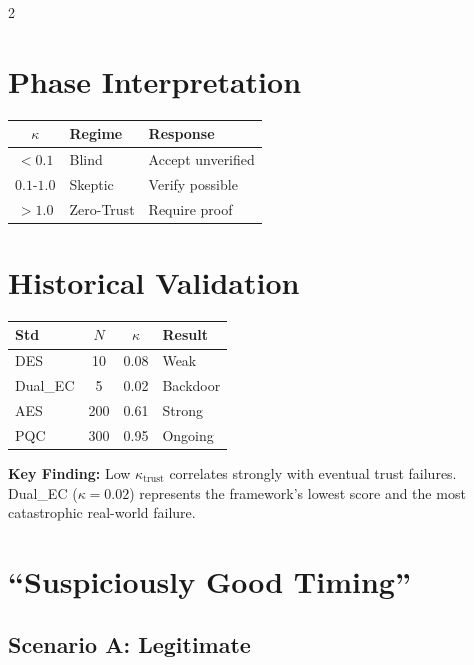 \documentclass[11pt]{article}
\begin{document}
\begin{multicols}{2}
\section{Phase Interpretation}

\begin{center}
\small
\begin{tabular}{@{}cll@{}}
\toprule
$\kappa$ & \textbf{Regime} & \textbf{Response} \\
\midrule
$<0.1$ & \textcolor{trustlow}{Blind} & Accept unverified \\
$0.1$-$1.0$ & \textcolor{trustmed}{Skeptic} & Verify possible \\
$>1.0$ & \textcolor{trusthigh}{Zero-Trust} & Require proof \\
\bottomrule
\end{tabular}
\end{center}

\section{Historical Validation}

\begin{center}
\small
\begin{tabular}{@{}lccl@{}}
\toprule
\textbf{Std} & $N$ & $\kappa$ & \textbf{Result} \\
\midrule
DES & 10 & \textcolor{trustlow}{0.08} & Weak \\
Dual\_EC & 5 & \textcolor{trustlow}{0.02} & Backdoor \\
AES & 200 & \textcolor{trustmed}{0.61} & Strong \\
PQC & 300 & \textcolor{trusthigh}{0.95} & Ongoing \\
\bottomrule
\end{tabular}
\end{center}

\textbf{Key Finding:} Low $\kappa_{\text{trust}}$ correlates strongly with eventual trust failures. Dual\_EC ($\kappa=0.02$) represents the framework's lowest score and the most catastrophic real-world failure.

\section{``Suspiciously Good Timing''}

\subsection{Scenario A: Legitimate}


\end{multicols}
\end{document}
